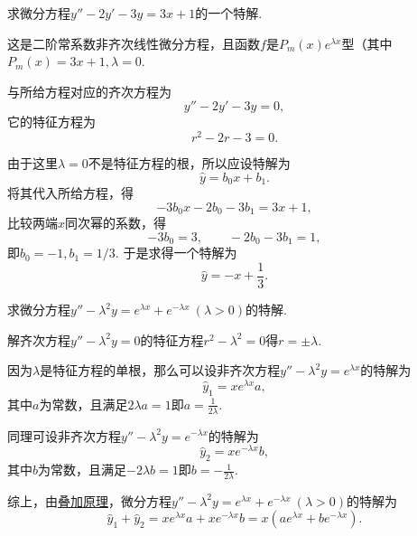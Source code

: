 \begin{example}
求微分方程\(y''-2y'-3y=3x+1\)的一个特解.
\begin{solution}
这是二阶常系数非齐次线性微分方程，且函数\(f\)是\(P_m(x) e^{\lambda x}\)型（其中\(P_m(x) = 3x+1, \lambda=0\).

与所给方程对应的齐次方程为\[
y''-2y'-3y=0,
\]它的特征方程为\[
r^2-2r-3=0.
\]

由于这里\(\lambda=0\)不是特征方程的根，所以应设特解为\[
\hat{y} = b_0 x + b_1.
\]将其代入所给方程，得\[
-3 b_0 x - 2 b_0 - 3 b_1 = 3x+1,
\]比较两端\(x\)同次幂的系数，得\[
-3 b_0 = 3, \qquad -2 b_0 - 3 b_1 = 1,
\]即\(b_0=-1, b_1=1/3\).
于是求得一个特解为\[
\hat{y} = -x + \frac{1}{3}.
\]
\end{solution}
\end{example}

\begin{example}
求微分方程\(y'' - \lambda^2 y = e^{\lambda x} + e^{-\lambda x}\ (\lambda>0)\)的特解.
\begin{solution}
解齐次方程\(y'' - \lambda^2 y = 0\)的特征方程\(r^2 - \lambda^2 = 0\)得\(r = \pm\lambda\).

因为\(\lambda\)是特征方程的单根，那么可以设非齐次方程\(y'' - \lambda^2 y = e^{\lambda x}\)的特解为\[
\hat{y}_1 = x e^{\lambda x} a,
\]其中\(a\)为常数，且满足\(2\lambda a = 1\)即\(a = \frac{1}{2\lambda}\).

同理可设非齐次方程\(y'' - \lambda^2 y = e^{-\lambda x}\)的特解为\[
\hat{y}_2 = x e^{-\lambda x} b,
\]其中\(b\)为常数，且满足\(-2\lambda b = 1\)即\(b = -\frac{1}{2\lambda}\).

综上，由\hyperref[theorem:微分方程.二阶非齐次线性微分方程的解的叠加原理]{叠加原理}，微分方程\(y'' - \lambda^2 y = e^{\lambda x} + e^{-\lambda x}\ (\lambda>0)\)的特解为\[
\hat{y}_1 + \hat{y}_2 = x e^{\lambda x} a + x e^{-\lambda x} b
= x(a e^{\lambda x} + b e^{-\lambda x}).
\]
\end{solution}
\end{example}

